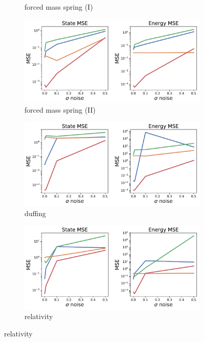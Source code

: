 \documentclass{article}
\begin{document}
\begin{figure}[h!]
\begin{subfigure}[b]{0.42\textwidth}
\caption{forced mass spring (I)}
\end{subfigure}
\begin{subfigure}[b]{0.42\textwidth}
\includegraphics[width=\textwidth]{figures/figures/forced_mass_spring/2/forced_mass_spring_noise_scaling.pdf}
\caption{forced mass spring (II)}
\end{subfigure}
\begin{subfigure}[b]{0.42\textwidth}
\includegraphics[width=\textwidth]{figures/figures/duffing/1/duffing_noise_scaling.pdf}
\caption{duffing}
\end{subfigure}
\begin{subfigure}[b]{0.42\textwidth}
\includegraphics[width=\textwidth]{figures/figures/relativity/1/relativity_noise_scaling.pdf}
\caption{relativity}
\end{subfigure}
\end{figure}
\end{document}
